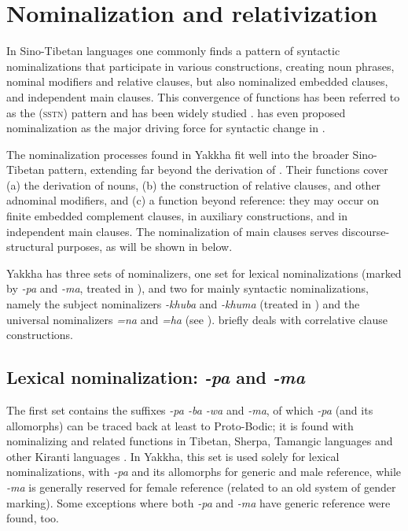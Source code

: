 
\chapter{Nominalization and relativization}\label{ch-nmlz}

In Sino-Tibetan languages one commonly finds a pattern of syntactic nominalizations that participate in various constructions, creating noun phrases, nominal modifiers and relative clauses, but also nominalized embedded clauses,  and independent main clauses. This convergence of functions has been referred to as the  (\textsc{sstn}) pattern \citep[271]{Bickel1999Nominalization} and has been widely studied \citep{Matisoff1972Lahu, DeLancey1989Relativization, Genetti1992Semantic,  Genettietal2008_Nominalization, Saxena1992_Finite, Ebert1994The-structure, DeLancey1999Relativization, Bickel1999Nominalization, Watters2002A-grammar, Noonan2008_Nominalization, Doornenbal2008_Nominalization}. \citet{DeLancey2011_Finite} has even proposed nominalization as the major driving force for syntactic change in . 
 
The nominalization processes found in Yakkha fit well into the broader Sino-Tibetan pattern, extending far beyond the derivation of . Their functions cover (a) the derivation of nouns, (b) the construction of relative clauses,  and other adnominal modifiers, and (c) a function beyond  reference: they may occur on finite embedded complement clauses, in auxiliary constructions, and  in independent main clauses. The nominalization of  main clauses serves discourse-structural purposes, as will be shown in  below.

Yakkha has three sets of nominalizers, one set for lexical nominalizations (marked by \emph{-pa} and \emph{-ma}, treated in ), and two for mainly syntactic nominalizations, namely the subject nominalizers \emph{-khuba} and \emph{-khuma} (treated in ) and the universal nominalizers \emph{=na} and \emph{=ha} (see ).  briefly  deals with correlative clause constructions.


\section{Lexical nominalization: \emph{-pa} and \emph{-ma}}\label{nmlz-pa}

The first set contains the  suffixes \emph{-pa \ti -ba \ti -wa} and \emph{-ma}, of which \emph{-pa} (and its allomorphs) can be traced back at least to Proto-Bodic; it is found with nominalizing and related functions in Tibetan,  Sherpa,  Tamangic languages and other Kiranti languages \citep{DeLancey2002_Relativization, DeLancey2011_Finite, Genetti1992Semantic}. In Yakkha, this set is used solely for lexical nominalizations, with \emph{-pa} and its allomorphs for generic and male reference, while \emph{-ma} is generally reserved for female reference (related to an old system of gender marking). Some exceptions where both \emph{-pa} and \emph{-ma} have generic reference were found, too. 

